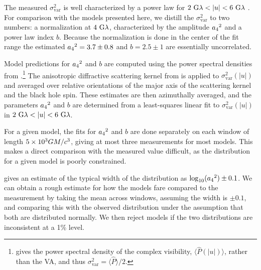 The measured $\sigma_\text{var}^2$ is well characterized by a power law for $2~{\rm G}\lambda < |u| < 6~{\rm G}\lambda$ \citep{Georgiev_2022}.  For comparison with the models presented here, we distill the $\sigma_{\text{var}}^2$ to two numbers: a normalization at $4~{\rm G}\lambda$, characterized by the amplitude ${a_4}^2$ and a power law index $b$.  Because the normalization is done in the center of the fit range the estimated ${a_4}^2=3.7\pm0.8$ and $b=2.5\pm1$ are essentially uncorrelated.

Model predictions for ${a_4}^2$ and $b$ are computed using the power spectral densities from \citet{Georgiev_2022}.\footnote{\citet{Georgiev_2022} gives the power spectral density of the complex visibility, $\langle\hat{P}(|u|)\rangle$, rather than the VA, and thus $\sigma_\text{var}^2=\langle \hat{P}\rangle/2$. } The anisotropic diffractive scattering kernel from \citet{Johnson_2018} is applied to $\sigma_\text{var}^2(|u|)$ and averaged over relative orientations of the major axis of the scattering kernel and the black hole spin.  These estimates are then azimuthally averaged, and the parameters ${a_4}^2$ and $b$ are determined from a least-squares linear fit to $\sigma_\text{var}^2(|u|)$ in $2~{\rm G}\lambda < |u| < 6~{\rm G}\lambda$.

For a given model, the fits for ${a_4}^2$ and $b$ are done separately on each window of length $5 \times 10^3 GM/c^3$, giving at most three measurements for most models. This makes a direct comparison with the measured value difficult, as the distribution for a given model is poorly constrained.

\citet{Georgiev_2022} gives an estimate of the typical width of the distribution as $\log_{10}({a_4}^2) \pm 0.1$. We can obtain a rough estimate for how the models fare compared to the measurement by taking the mean across windows, assuming the width is $\pm 0.1$, and comparing this with the observed distribution under the assumption that both are distributed normally. We then reject models if the two distributions are inconsistent at a 1\% level.
